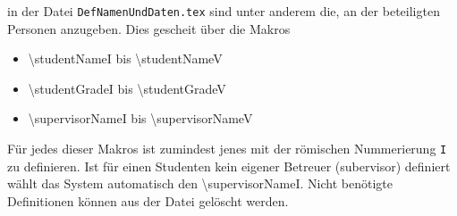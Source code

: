\renewcommand*{\authorOfNextLines}{Helmut Quinz}
in der Datei \texttt{DefNamenUndDaten.tex} sind unter anderem die, an der \typeOfWork beteiligten Personen anzugeben.
Dies gescheit über die Makros
\begin{itemize}
	\item \textbackslash studentNameI bis \textbackslash studentNameV
	\item \textbackslash studentGradeI bis \textbackslash studentGradeV
	\item \textbackslash supervisorNameI bis \textbackslash supervisorNameV
\end{itemize}

Für jedes dieser Makros ist zumindest jenes mit der römischen Nummerierung \texttt{I} zu definieren.
Ist für einen Studenten kein eigener Betreuer (subervisor) definiert wählt das System automatisch den \textbackslash supervisorNameI.
Nicht benötigte Definitionen können aus der Datei gelöscht werden.